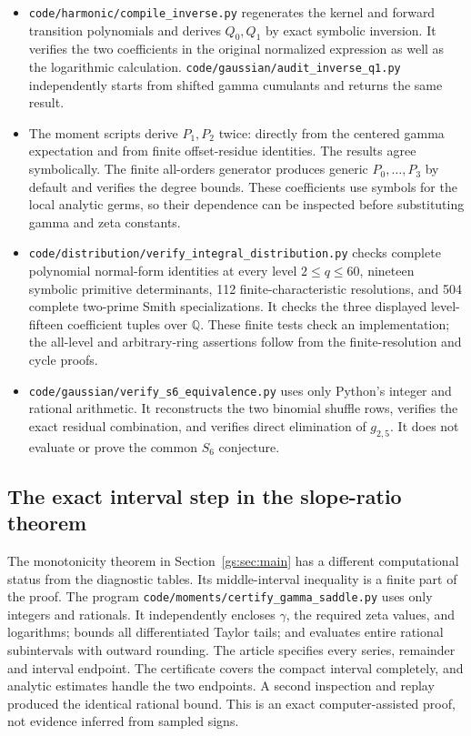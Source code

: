 \documentclass[11pt,a4paper]{article}
\numberwithin{equation}{section}
\theoremstyle{plain}
\theoremstyle{definition}
\theoremstyle{remark}
\newcommand{\src}[1]{\nolinkurl{#1}}
\begin{document}
\begin{itemize}[leftmargin=*]
\item \src{code/harmonic/compile_inverse.py} regenerates the kernel
and forward transition polynomials and derives $Q_0,Q_1$ by
exact symbolic inversion. It verifies the two coefficients in the
original normalized expression as well as the logarithmic
calculation. \src{code/gaussian/audit_inverse_q1.py} independently
starts from shifted gamma cumulants and returns the same result.

\item The moment scripts derive $P_1,P_2$ twice: directly from
the centered gamma expectation and from finite offset-residue
identities. The results agree symbolically. The finite all-orders
generator produces generic $P_0,\ldots,P_3$ by default and verifies
the degree bounds. These coefficients use symbols for the local
analytic germs, so their dependence can be inspected before
substituting gamma and zeta constants.

\item \src{code/distribution/verify_integral_distribution.py}
checks complete polynomial normal-form identities at every level
$2\le q\le60$, nineteen symbolic primitive determinants,
112 finite-characteristic resolutions, and 504 complete two-prime
Smith specializations. It checks the three displayed level-fifteen
coefficient tuples over $\mathbb Q$. These finite tests check an
implementation; the all-level and arbitrary-ring assertions follow
from the finite-resolution and cycle proofs.

\item \src{code/gaussian/verify_s6_equivalence.py} uses only
Python's integer and rational arithmetic. It reconstructs the two
binomial shuffle rows, verifies the exact residual combination,
and verifies direct elimination of $g_{2,5}$. It does not evaluate
or prove the common $S_6$ conjecture.
\end{itemize}

\subsection{The exact interval step in the slope-ratio theorem}

The monotonicity theorem in Section~\ref{gs:sec:main} has a different
computational status from the diagnostic tables. Its middle-interval
inequality is a finite part of the proof. The program
\src{code/moments/certify_gamma_saddle.py} uses only integers and
rationals. It independently encloses $\gamma$, the required zeta
values, and logarithms; bounds all differentiated Taylor tails;
and evaluates entire rational subintervals with outward rounding.
The article specifies every series, remainder and interval endpoint.
The certificate covers the compact interval completely, and
analytic estimates handle the two endpoints. A second inspection
and replay produced the identical rational bound. This is an exact
computer-assisted proof, not evidence inferred from sampled signs.
\end{document}
